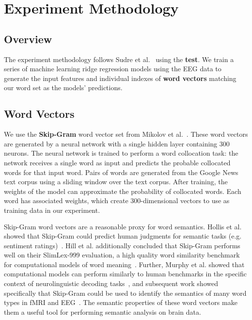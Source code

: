 \section{Experiment Methodology}
\label{sec:methodology}

\subsection{Overview}
The experiment methodology follows Sudre et al.~\cite{Sudre2012} using the {\bf 
\tvt test}. We train a series of machine learning ridge regression models using 
the EEG data to generate the input features and individual indexes of {\bf word 
vectors} matching our word set as the models' predictions.

\subsection{Word Vectors}
We use the {\bf Skip-Gram} word vector set from Mikolov et 
al.~\cite{Mikolov2013}. These word vectors are generated by a neural network 
with a single hidden layer containing 300 neurons. The neural network is 
trained to perform a word collocation task: the network receives a single word 
as input and predicts the probable collocated words for that input word. Pairs 
of words are generated from the Google News text corpus using a sliding window 
over the text corpus. After training, the weights of the model can approximate 
the probability of collocated words. Each word has associated weights, which 
create 300-dimensional vectors to use as training data in our experiment.

Skip-Gram word vectors are a reasonable proxy for word semantics. Hollis et al.  
showed that Skip-Gram could predict human judgments for semantic tasks (e.g.  
sentiment ratings)~\cite{hollis2017extrapolating}. Hill et al.  additionally 
concluded that Skip-Gram performs well on their SlimLex-999 evaluation, a high 
quality word similarity benchmark for computational models of word 
meaning~\cite{hill2016simlex}. Further, Murphy et al. showed that computational 
models can perform similarly to human benchmarks in the specific context of 
neurolinguistic decoding tasks~\cite{Murphy2012}, and subsequent work showed 
specifically that Skip-Gram could be used to identify the semantics of many 
word types in fMRI and EEG~\cite{xu2016brainbench}. The semantic properties of 
these word vectors make them a useful tool for performing semantic analysis on 
brain data.

